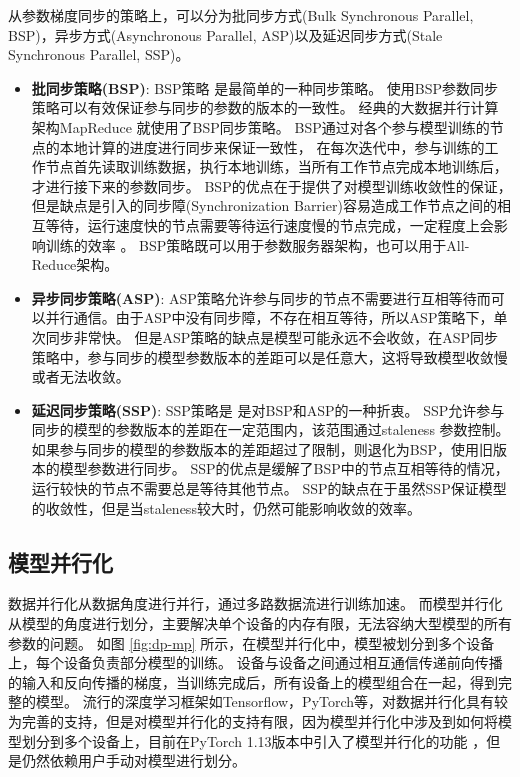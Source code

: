 从参数梯度同步的策略上，可以分为批同步方式(Bulk Synchronous Parallel, BSP)，异步方式(Asynchronous Parallel, ASP)以及延迟同步方式(Stale Synchronous Parallel, SSP)。
\begin{itemize}
	\item \textbf{批同步策略(BSP)}: BSP策略 是最简单的一种同步策略。
	使用BSP参数同步策略可以有效保证参与同步的参数的版本的一致性。
	经典的大数据并行计算架构MapReduce 就使用了BSP同步策略。
	BSP通过对各个参与模型训练的节点的本地计算的进度进行同步来保证一致性，
	在每次迭代中，参与训练的工作节点首先读取训练数据，执行本地训练，当所有工作节点完成本地训练后，才进行接下来的参数同步。
	BSP的优点在于提供了对模型训练收敛性的保证，但是缺点是引入的同步障(Synchronization Barrier)容易造成工作节点之间的相互等待，运行速度快的节点需要等待运行速度慢的节点完成，一定程度上会影响训练的效率 。
	BSP策略既可以用于参数服务器架构，也可以用于All-Reduce架构。
	\item \textbf{异步同步策略(ASP)}: ASP策略允许参与同步的节点不需要进行互相等待而可以并行通信。由于ASP中没有同步障，不存在相互等待，所以ASP策略下，单次同步非常快。
	但是ASP策略的缺点是模型可能永远不会收敛，在ASP同步策略中，参与同步的模型参数版本的差距可以是任意大，这将导致模型收敛慢或者无法收敛。
	\item \textbf{延迟同步策略(SSP)}: SSP策略是 是对BSP和ASP的一种折衷。
	SSP允许参与同步的模型的参数版本的差距在一定范围内，该范围通过staleness 参数控制。
	如果参与同步的模型的参数版本的差距超过了限制，则退化为BSP，使用旧版本的模型参数进行同步。
	SSP的优点是缓解了BSP中的节点互相等待的情况，运行较快的节点不需要总是等待其他节点。
	SSP的缺点在于虽然SSP保证模型的收敛性，但是当staleness较大时，仍然可能影响收敛的效率。

\end{itemize}

\subsection{模型并行化}
数据并行化从数据角度进行并行，通过多路数据流进行训练加速。
而模型并行化从模型的角度进行划分，主要解决单个设备的内存有限，无法容纳大型模型的所有参数的问题。
如图 \ref{fig:dp-mp} 所示，在模型并行化中，模型被划分到多个设备上，每个设备负责部分模型的训练。
设备与设备之间通过相互通信传递前向传播的输入和反向传播的梯度，当训练完成后，所有设备上的模型组合在一起，得到完整的模型。
流行的深度学习框架如Tensorflow，PyTorch等，对数据并行化具有较为完善的支持，但是对模型并行化的支持有限，因为模型并行化中涉及到如何将模型划分到多个设备上，目前在PyTorch 1.13版本中引入了模型并行化的功能 ，但是仍然依赖用户手动对模型进行划分。


